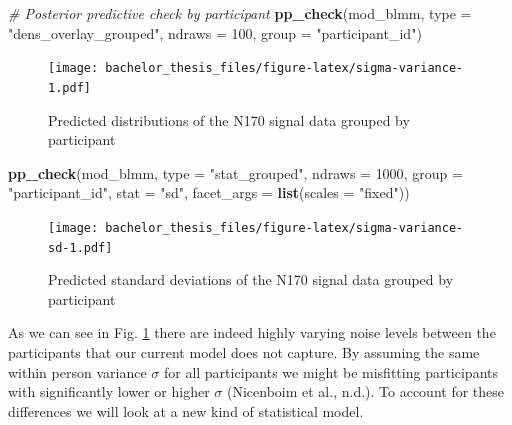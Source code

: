 \documentclass[
  doc,12pt,floatsintext]{apa7}
\newenvironment{Shaded}{\begin{snugshade}}{\end{snugshade}}
\newcommand{\AttributeTok}[1]{\textcolor[rgb]{0.13,0.29,0.53}{#1}}
\newcommand{\CommentTok}[1]{\textcolor[rgb]{0.56,0.35,0.01}{\textit{#1}}}
\newcommand{\DecValTok}[1]{\textcolor[rgb]{0.00,0.00,0.81}{#1}}
\newcommand{\FunctionTok}[1]{\textcolor[rgb]{0.13,0.29,0.53}{\textbf{#1}}}
\newcommand{\NormalTok}[1]{#1}
\newcommand{\StringTok}[1]{\textcolor[rgb]{0.31,0.60,0.02}{#1}}
\begin{document}
\begin{Shaded}
\begin{Highlighting}[]
\CommentTok{\# Posterior predictive check by participant}
\FunctionTok{pp\_check}\NormalTok{(mod\_blmm, }
         \AttributeTok{type =} \StringTok{"dens\_overlay\_grouped"}\NormalTok{,}
         \AttributeTok{ndraws =} \DecValTok{100}\NormalTok{,}
         \AttributeTok{group =} \StringTok{"participant\_id"}\NormalTok{)}
\end{Highlighting}
\end{Shaded}

\begin{figure}
\centering
\texttt{[image: bachelor\_thesis\_files/figure-latex/sigma-variance-1.pdf]}
\caption{\label{fig:sigma-variance}Predicted distributions of the N170 signal data grouped by participant}
\end{figure}



\begin{Shaded}
\begin{Highlighting}[]
\FunctionTok{pp\_check}\NormalTok{(mod\_blmm,}
         \AttributeTok{type =} \StringTok{"stat\_grouped"}\NormalTok{,}
         \AttributeTok{ndraws =} \DecValTok{1000}\NormalTok{,}
         \AttributeTok{group =} \StringTok{"participant\_id"}\NormalTok{,}
         \AttributeTok{stat =} \StringTok{"sd"}\NormalTok{,}
         \AttributeTok{facet\_args =} \FunctionTok{list}\NormalTok{(}\AttributeTok{scales =} \StringTok{"fixed"}\NormalTok{))}
\end{Highlighting}
\end{Shaded}

\begin{figure}
\centering
\texttt{[image: bachelor\_thesis\_files/figure-latex/sigma-variance-sd-1.pdf]}
\caption{\label{fig:sigma-variance-sd}Predicted standard deviations of the N170 signal data grouped by participant}
\end{figure}

As we can see in Fig. \ref{fig:sigma-variance} there are indeed highly varying noise levels between the participants that our current model does not capture. By assuming the same within person variance \(\sigma\) for all participants we might be misfitting participants with significantly lower or higher \(\sigma\) (Nicenboim et al., n.d.). To account for these differences we will look at a new kind of statistical model.
\end{document}
